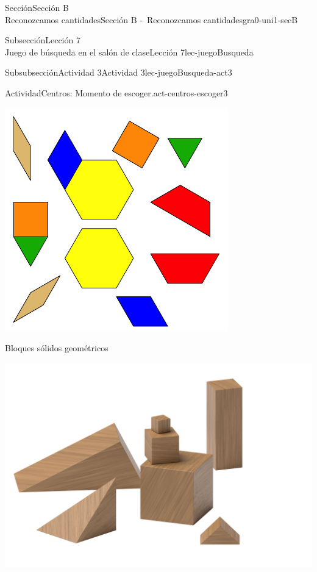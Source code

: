 \begin{sectionptx}{Sección}{{\Large Sección B\\}Reconozcamos cantidades}{}{Sección B -~Reconozcamos cantidades}{}{}{gra0-uni1-secB}
\begin{subsectionptx}{Subsección}{{\normalsize Lección 7\\[-0.05cm]}Juego de búsqueda en el salón de clase}{}{Lección 7}{}{}{lec-juegoBusqueda}
\begin{subsubsectionptx}{Subsubsección}{Actividad 3}{}{Actividad 3}{}{}{lec-juegoBusqueda-act3}
\begin{activity}{Actividad}{Centros: Momento de escoger.}{act-centros-escoger3}
\begin{sidebyside}{2}{0.025}{0.025}{0.05}
\begin{sbspanel}{0.45}
\includegraphics[max width=\linewidth, center]{external/svg-source/tikz-file-147344.pdf}
\end{sbspanel}%
\end{sidebyside}%
\begin{sidebyside}{2}{0.025}{0.025}{0.05}%
\begin{sbspanel}{0.45}%
Bloques sólidos geométricos%
\par
\includegraphics[max width=\linewidth, center]{external/png-source/K.1.A Beta Student Workbook.Geoblocks.png}
\end{sbspanel}%

\end{sidebyside}
\end{activity}
\end{subsubsectionptx}
\end{subsectionptx}
\end{sectionptx}
